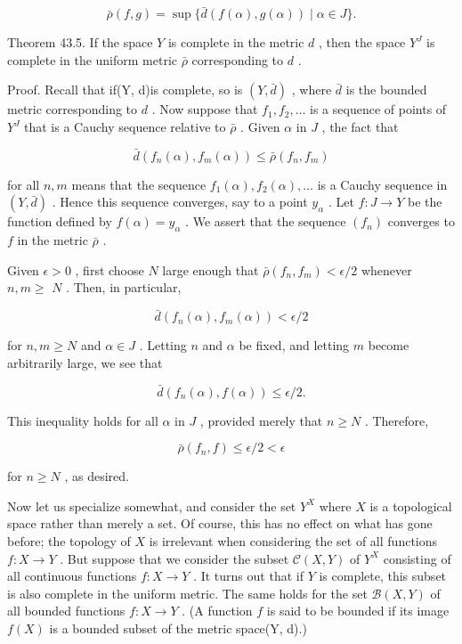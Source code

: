 \[
\bar{\rho }\left( {f,g}\right)  = \sup \{ \bar{d}\left( {f\left( \alpha \right) ,g\left( \alpha \right) }\right)  \mid  \alpha  \in  J\} .
\]

Theorem 43.5. If the space \(Y\) is complete in the metric \(d\) , then the space \({Y}^{J}\) is complete in the uniform metric \(\bar{\rho }\) corresponding to \(d\) .

Proof. Recall that if(Y, d)is complete, so is \(\left( {Y,\bar{d}}\right)\) , where \(\bar{d}\) is the bounded metric corresponding to \(d\) . Now suppose that \({f}_{1},{f}_{2},\ldots\) is a sequence of points of \({Y}^{J}\) that is a Cauchy sequence relative to \(\bar{\rho }\) . Given \(\alpha\) in \(J\) , the fact that

\[
\bar{d}\left( {{f}_{n}\left( \alpha \right) ,{f}_{m}\left( \alpha \right) }\right)  \leq  \bar{\rho }\left( {{f}_{n},{f}_{m}}\right)
\]

for all \(n,m\) means that the sequence \({f}_{1}\left( \alpha \right) ,{f}_{2}\left( \alpha \right) ,\ldots\) is a Cauchy sequence in \(\left( {Y,\bar{d}}\right)\) . Hence this sequence converges, say to a point \({y}_{\alpha }\) . Let \(f : J \rightarrow  Y\) be the function defined by \(f\left( \alpha \right)  = {y}_{\alpha }\) . We assert that the sequence \(\left( {f}_{n}\right)\) converges to \(f\) in the metric \(\bar{\rho }\) .

Given \(\epsilon  > 0\) , first choose \(N\) large enough that \(\bar{\rho }\left( {{f}_{n},{f}_{m}}\right)  < \epsilon /2\) whenever \(n,m \geq\)  \(N\) . Then, in particular,

\[
\bar{d}\left( {{f}_{n}\left( \alpha \right) ,{f}_{m}\left( \alpha \right) }\right)  < \epsilon /2
\]

for \(n,m \geq  N\) and \(\alpha  \in  J\) . Letting \(n\) and \(\alpha\) be fixed, and letting \(m\) become arbitrarily large, we see that

\[
\bar{d}\left( {{f}_{n}\left( \alpha \right) ,f\left( \alpha \right) }\right)  \leq  \epsilon /2.
\]

This inequality holds for all \(\alpha\) in \(J\) , provided merely that \(n \geq  N\) . Therefore,

\[
\bar{\rho }\left( {{f}_{n},f}\right)  \leq  \epsilon /2 < \epsilon
\]

for \(n \geq  N\) , as desired.

Now let us specialize somewhat, and consider the set \({Y}^{X}\) where \(X\) is a topological space rather than merely a set. Of course, this has no effect on what has gone before; the topology of \(X\) is irrelevant when considering the set of all functions \(f : X \rightarrow  Y\) . But suppose that we consider the subset \(\mathcal{C}\left( {X,Y}\right)\) of \({Y}^{X}\) consisting of all continuous functions \(f : X \rightarrow  Y\) . It turns out that if \(Y\) is complete, this subset is also complete in the uniform metric. The same holds for the set \(\mathcal{B}\left( {X,Y}\right)\) of all bounded functions \(f : X \rightarrow  Y\) . (A function \(f\) is said to be bounded if its image \(f\left( X\right)\) is a bounded subset of the metric space(Y, d).)

